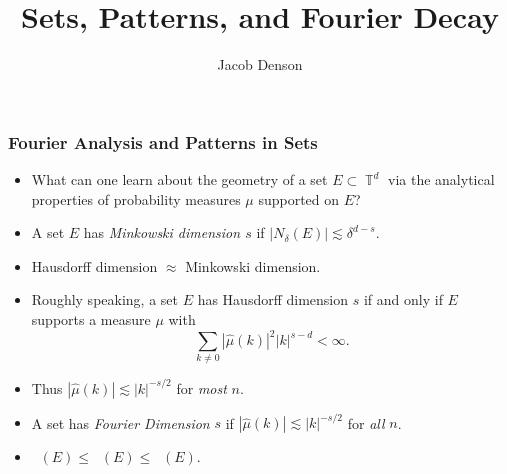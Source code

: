 \documentclass[usenames,dvipsnames]{beamer}
\title{Sets, Patterns, and Fourier Decay}
\author{Jacob Denson}
\institute{}
\DeclareMathOperator{\TT}{\mathbb{T}}
\DeclareMathOperator{\fordim}{\text{dim}_{\mathbb{F}}}
\DeclareMathOperator{\hausdim}{\text{dim}_{\mathbb{H}}}
\DeclareMathOperator{\minkdim}{\text{dim}_{\mathbb{M}}}
\begin{document}
\maketitle

\begin{frame}
    \frametitle{Fourier Analysis and Patterns in Sets}

    \begin{itemize}
        \item What can one learn about the geometry of a set $E \subset \TT^d$ via the analytical properties of probability measures $\mu$ supported on $E$?
        \pause

        \item A set $E$ has \emph{Minkowski dimension $s$} if $|N_\delta(E)| \lesssim \delta^{d-s}$.
        \pause

        \item Hausdorff dimension $\approx$ Minkowski dimension.
        \pause

        \item Roughly speaking, a set $E$ has Hausdorff dimension $s$ if and only if $E$ supports a measure $\mu$ with
        \[ \sum_{k \neq 0} |\widehat{\mu}(k)|^2 |k|^{s-d} < \infty. \]
        \pause

        \item Thus $|\widehat{\mu}(k)| \lesssim |k|^{-s/2}$ for \emph{most} $n$.
        \pause

        \item A set has \emph{Fourier Dimension} $s$ if $|\widehat{\mu}(k)| \lesssim |k|^{-s/2}$ for \emph{all} $n$.

        \item $\fordim(E) \leq \hausdim(E) \leq \minkdim(E)$.
    \end{itemize}
\end{frame}
\end{document}
